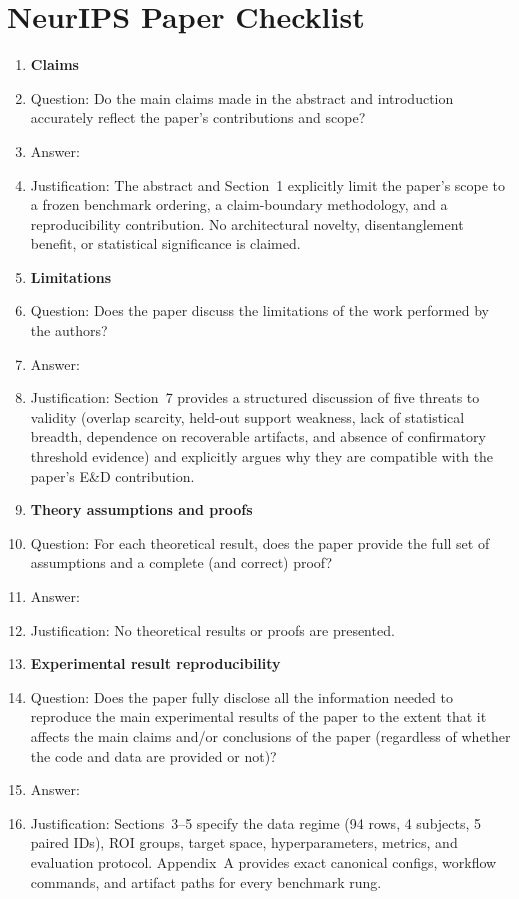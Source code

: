 \section*{NeurIPS Paper Checklist}

\begin{enumerate}

\item {\bf Claims}
    \item[] Question: Do the main claims made in the abstract and introduction accurately reflect the paper's contributions and scope?
    \item[] Answer: \answerYes{}
    \item[] Justification: The abstract and Section~1 explicitly limit the paper's scope to a frozen benchmark ordering, a claim-boundary methodology, and a reproducibility contribution.  No architectural novelty, disentanglement benefit, or statistical significance is claimed.

\item {\bf Limitations}
    \item[] Question: Does the paper discuss the limitations of the work performed by the authors?
    \item[] Answer: \answerYes{}
    \item[] Justification: Section~7 provides a structured discussion of five threats to validity (overlap scarcity, held-out support weakness, lack of statistical breadth, dependence on recoverable artifacts, and absence of confirmatory threshold evidence) and explicitly argues why they are compatible with the paper's E\&D contribution.

\item {\bf Theory assumptions and proofs}
    \item[] Question: For each theoretical result, does the paper provide the full set of assumptions and a complete (and correct) proof?
    \item[] Answer: \answerNA{}
    \item[] Justification: No theoretical results or proofs are presented.

    \item {\bf Experimental result reproducibility}
    \item[] Question: Does the paper fully disclose all the information needed to reproduce the main experimental results of the paper to the extent that it affects the main claims and/or conclusions of the paper (regardless of whether the code and data are provided or not)?
    \item[] Answer: \answerYes{}
    \item[] Justification: Sections~3--5 specify the data regime (94 rows, 4 subjects, 5 paired IDs), ROI groups, target space, hyperparameters, metrics, and evaluation protocol.  Appendix~A provides exact canonical configs, workflow commands, and artifact paths for every benchmark rung.


\end{enumerate}
